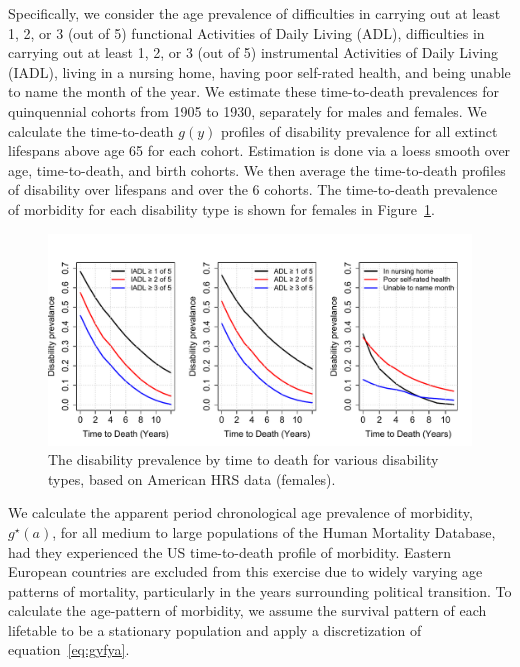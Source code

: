 \documentclass[11pt,oneside,a4paper]{article} %
\begin{document}
Specifically, we consider the age prevalence of difficulties in carrying out at
least 1, 2, or 3 (out of 5) functional Activities of Daily Living (ADL),
difficulties in carrying out at least 1, 2, or 3 (out of 5) instrumental
Activities of Daily Living (IADL), living in a nursing home, having poor
self-rated health, and being unable to name the month of the year. We estimate
these time-to-death prevalences for quinquennial cohorts from 1905 to 1930,
separately for males and females. We calculate the time-to-death $g(y)$ profiles of
disability prevalence for all extinct lifespans above age 65 for each cohort.
Estimation is done via a loess smooth over age, time-to-death, and birth
cohorts. We
then average the time-to-death profiles of disability over lifespans and over the 6 cohorts.
 The time-to-death prevalence of morbidity for
each disability type is shown for females in Figure~\ref{fig:DisbyTTD}.


\begin{figure}
\begin{adjustwidth}{-1.5cm}{}
	\centering
	\includegraphics[scale=.6]{Figures/DisbyTTD.pdf}
	\caption{The disability prevalence by time to death for various disability types, based on American HRS data (females).}
	\label{fig:DisbyTTD}
\end{adjustwidth}
\end{figure}


We calculate the apparent period chronological age prevalence of morbidity,
$g^\star(a)$, for all medium to large populations of the Human Mortality
Database, had they experienced the US time-to-death profile of morbidity. Eastern European countries are excluded from this exercise due to widely varying
age patterns of mortality, particularly in the years surrounding political
transition. To calculate the age-pattern of morbidity, we assume the survival
pattern of each lifetable to be a stationary population and apply a
discretization of equation~\eqref{eq:gyfya}. 
\end{document}
